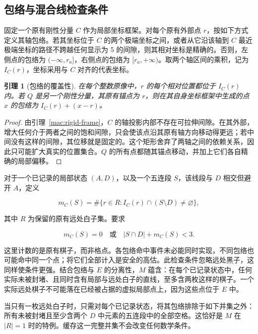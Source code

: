 \documentclass[11pt]{article}
\newtheorem{lemma}[theorem]{引理}
\theoremstyle{definition}
\theoremstyle{remark}
\begin{document}
\subsection{包络与混合线检查条件}\label{mac:envelope-section}

固定一个原有刚性分量 \(C\) 作为局部坐标框架。对每个原有外部点 \(r\)，按如下方式定义其轴包络。若其坐标位于 \(C\) 的两个极端坐标之间，或者从它沿该轴到 \(C\) 最近极端坐标的路径不跨越任何显示为 5 的间隙，则其相对坐标是精确的。否则，左侧点的包络为 \(( -\infty,r_a]\)，右侧点的包络为 \([r_a,+\infty)\)。取两个轴区间的乘积，记为 \(I_C(r)\)，坐标采用与 \(C\) 对齐的代表坐标。

\begin{lemma}[包络的覆盖性]\label{mac:envelope}
在每个整数原像中，\(r\) 的每个相对位置都位于 \(I_C(r)\) 内。若 \(Q\) 是另一个刚性分量，其原有锚点为 \(r\)，则在其自身坐标框架中生成的点 \(x\) 的包络为 \(I_C(r)+(x-r)\)。

\end{lemma}
\begin{proof}
由引理~\ref{mac:rigid-frame}，\(C\) 的轴投影内部不存在可拉伸间隙。在其外部，增大任何介于两者之间的饱和间隙，只会使该点沿其原有轴方向移动得更远；若中间没有这样的间隙，其位移就是固定的。这个矩形舍弃了两轴之间的依赖关系，因此只可能扩大真实的位置集合。\(Q\) 的所有点都随其锚点移动，并加上它们各自精确的局部偏移。
\end{proof}

对于一个已记录的局部状态 \((A,D)\)，以及一个五连段 \(S\)，该线段与 \(D\) 相交但避开 \(A\)，定义

\[
 m_C(S)=\#\{r\in R:I_C(r)\cap(S\setminus D)\ne\varnothing\},
\]

其中 \(R\) 为保留的原有远处白子集。要求

\[
 m_C(S)=0\quad\text{或}\quad |S\cap D|+m_C(S)<3.\tag{M}
\]

这里计数的是原有棋子，而非格点。各包络命中事件未必能同时实现，不同包络也可能命中同一个点；将它们全部计入是安全的高估。此检查条件忽略远处黑子，这同样使条件更强。结合包络与 \(E\) 的分离性，\(M\) 蕴含：在每个已记录状态中，任何实际未被封堵、且同时含有局部与远处白子的直线，至多含两枚这样的棋子。一个实际远处棋子不可能落在已经被占据的虚拟局部点上，因为这些点位于 \(E\) 中。

当只有一枚远处白子时，只需对每个已记录状态，将其包络排除于如下并集之外：所有未被封堵且至少含两个 \(D\) 中元素的五连段中的全部空格。这恰好是 \(M\) 在 \(|R|=1\) 时的特例。缓存这一完整并集不会改变任何数学条件。
\end{document}
